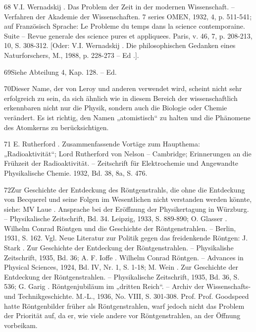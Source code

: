 \documentclass[11pt,a4paper]{book}
\begin{document}
68 V.I. Wernadskij . Das Problem der Zeit in der modernen Wissenschaft. -- Verfahren der Akademie der Wissenschaften. 7 series OMEN, 1932, 4, p. 511-541; auf Französisch Sprache: Le Probleme du temps dans la science contemporaine. Suite -- Revue generale des science pures et appliquees. Paris, v. 46, 7, p. 208-213, 10, S. 308-312. [Oder: V.I. Wernadskij . Die philosophischen Gedanken eines Naturforschers, M., 1988, p. 228-273 -- Ed .].



69Siehe Abteilung 4, Kap. 128. -- Ed.



70Dieser Name, der von Leroy und anderen verwendet wird, scheint nicht sehr erfolgreich zu sein, da sich ähnlich wie in diesem Bereich der wissenschaftlich erkennbaren nicht nur die Physik, sondern auch die Biologie oder Chemie verändert. Es ist richtig, den Namen „atomistisch“ zu halten und die Phänomene des Atomkerns zu berücksichtigen.



71 E. Rutherford . Zusammenfassende Vortäge zum Haupthema: „Radioaktivität“; Lord Rutherford von Nelson -- Cambridge; Erinnerungen an die Frühzeit der Radioaktivität. -- Zeitschrift für Elektrochemie und Angewandte Physikalische Chemie. 1932, Bd. 38, 8a, S. 476.



72Zur Geschichte der Entdeckung des Röntgenstrahls, die ohne die Entdeckung von Becquerel und seine Folgen im Wesentlichen nicht verstanden werden könnte, siehe: MV Laue . Ansprache bei der Eröffnung der Physikertagung in Würzburg. -- Physikalische Zeitschrift, Bd. 34. Leipzig, 1933, S. 889-890; O. Glasser . Wilhelm Conrad Röntgen und die Geschichte der Röntgenstrahlen. -- Berlin, 1931, S. 162. Vgl. Neue Literatur zur Politik gegen das freidenkende Röntgen: J. Stark . Zur Geschichte der Entdeckung der Röntgenstrahlen. -- Physikalishe Zeitschrift, 1935, Bd. 36; A. F. Ioffe . Wilhelm Conrad Röntgen. -- Advances in Physical Sciences, 1924, Bd. IV, Nr. 1, S. 1-18; M. Wein . Zur Geschichte der Entdeckung der Röntgenstrahlen. -- Physikalische Zeitschrift, 1935, Bd. 36, S. 536; G. Garig . Röntgenjubiläum im „dritten Reich“. -- Archiv der Wissenschafts- und Technikgeschichte. M.-L., 1936, No. VIII, S. 301-308. Prof. Prof. Goodspeed hatte Röntgenbilder früher als Röntgenstrahlen, warf jedoch nicht das Problem der Priorität auf, da er, wie viele andere vor Röntgenstrahlen, an der Öffnung vorbeikam.
\end{document}
